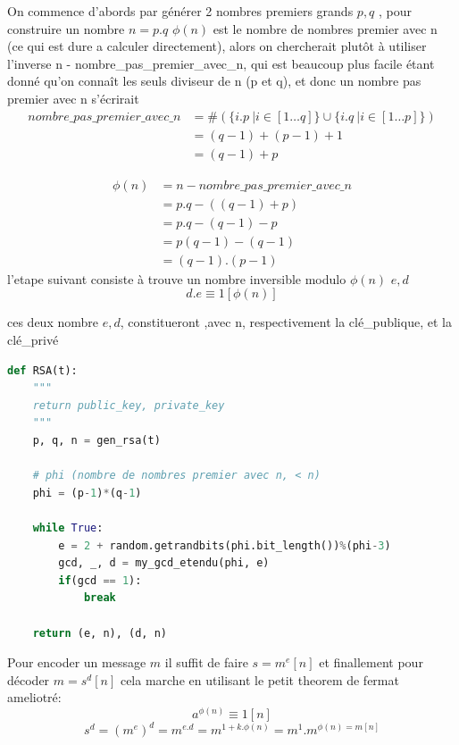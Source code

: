 \documentclass{article}
\begin{document}
On commence d'abords par générer 2 nombres premiers grands $p, q$ , pour construire un nombre $n = p.q$
$\phi(n)$ est le nombre de nombres premier avec n (ce qui est dure a calculer directement), alors on chercherait plutôt à utiliser l'inverse n - nombre\_pas\_premier\_avec\_n, qui est beaucoup plus facile étant donné qu'on connaît les seuls diviseur de n (p et q), et donc un nombre pas premier avec n s'écrirait 
\begin{equation} \label{eq1}
\begin{split}
\mathit{nombre\_pas\_premier\_avec\_n} & = \# (\{i.p\ | i \in [1 \dots q]\}\cup \{i.q\ | i \in [1 \dots p]\})\\
 & = (q-1) + (p-1) + 1 \\
 & = (q-1) + p
\end{split}
\end{equation}
 
\begin{equation} \label{eq1}
\begin{split}
\phi(n) & = n - \mathit{nombre\_pas\_premier\_avec\_n} \\
 & = p.q - ((q-1) + p) \\
 & = p.q - (q-1) - p \\
 & = p(q-1) - (q-1) \\
 & = (q-1).(p-1)
\end{split}
\end{equation}
 l'etape suivant consiste à trouve un nombre inversible modulo $\phi(n)$ $e, d$ 
 $$d.e \equiv 1[\phi(n)]$$

 ces deux nombre $e, d$, constitueront ,avec n, respectivement la clé\_publique, et la clé\_privé\\[1cm]
 
\begin{lstlisting}[language=Python, caption=RSA]
def RSA(t):
    """
    return public_key, private_key
    """
    p, q, n = gen_rsa(t)

    # phi (nombre de nombres premier avec n, < n)
    phi = (p-1)*(q-1)

    while True:
        e = 2 + random.getrandbits(phi.bit_length())%(phi-3)
        gcd, _, d = my_gcd_etendu(phi, e)
        if(gcd == 1):
            break
    
    return (e, n), (d, n)
\end{lstlisting}


Pour encoder un message $m$ il suffit de faire $s = m^e[n]$ et finallement pour décoder $m = s^d[n]$
cela marche en utilisant le petit theorem de fermat ameliotré: 
$$a^{\phi(n)} \equiv 1 [n]$$
$$s^d = (m^e)^d = m^{e.d} = m^{1 + k.\phi(n)} = m^1.m^{\phi(n) = m[n]}$$ 
\end{document}
